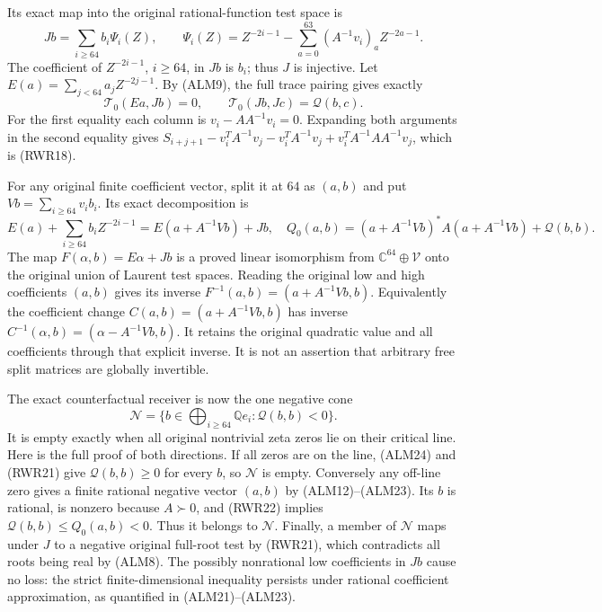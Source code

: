 Its exact map into the original rational-function test space is
\begin{equation}\tag{RWR20}
 Jb=\sum_{i\ge64}b_i\Psi_i(Z),\qquad
 \Psi_i(Z)=Z^{-2i-1}
       -\sum_{a=0}^{63}(A^{-1}v_i)_a Z^{-2a-1}.
\end{equation}
The coefficient of $Z^{-2i-1}$, $i\ge64$, in $Jb$ is $b_i$;
thus $J$ is injective. Let $E(a)=\sum_{j<64}a_jZ^{-2j-1}$.
By (ALM9), the full trace pairing gives exactly
\begin{equation}\tag{RWR21}
 \mathcal T_0(Ea,Jb)=0,\qquad
 \mathcal T_0(Jb,Jc)=\mathscr Q(b,c).
\end{equation}
For the first equality each column is $v_i-AA^{-1}v_i=0$.
Expanding both arguments in the second equality gives
$S_{i+j+1}-v_i^TA^{-1}v_j-v_i^TA^{-1}v_j+
v_i^TA^{-1}AA^{-1}v_j$, which is (RWR18).

For any original finite coefficient vector, split it at $64$ as
$(a,b)$ and put $Vb=\sum_{i\ge64}v_i b_i$. Its exact decomposition is
\begin{equation}\tag{RWR22}
 E(a)+\sum_{i\ge64}b_iZ^{-2i-1}
       =E(a+A^{-1}Vb)+Jb,
 \quad
 Q_0(a,b)=(a+A^{-1}Vb)^*A(a+A^{-1}Vb)+\mathscr Q(b,b).
\end{equation}
The map $F(\alpha,b)=E\alpha+Jb$ is a proved linear isomorphism
from $\mathbb C^{64}\oplus\mathscr V$ onto the original union of
Laurent test spaces. Reading the original low and high coefficients
$(a,b)$ gives its inverse $F^{-1}(a,b)=(a+A^{-1}Vb,b)$.
Equivalently the coefficient change $C(a,b)=(a+A^{-1}Vb,b)$ has
inverse $C^{-1}(\alpha,b)=(\alpha-A^{-1}Vb,b)$.
It retains the original quadratic value and all coefficients through
that explicit inverse. It is not an assertion that arbitrary free
split matrices are globally invertible.

The exact counterfactual receiver is now the one negative cone
\begin{equation}\tag{RWR23}
 \mathscr N=\{b\in\bigoplus_{i\ge64}\mathbb Q e_i:
                         \mathscr Q(b,b)<0\}.
\end{equation}
It is empty exactly when all original nontrivial zeta zeros lie on
their critical line. Here is the full proof of both directions.
If all zeros are on the line, (ALM24) and (RWR21) give
$\mathscr Q(b,b)\ge0$ for every $b$, so $\mathscr N$ is empty.
Conversely any off-line zero gives a finite rational negative vector
$(a,b)$ by (ALM12)--(ALM23). Its $b$ is rational, is nonzero because
$A\succ0$, and (RWR22) implies
$\mathscr Q(b,b)\le Q_0(a,b)<0$. Thus it belongs to $\mathscr N$.
Finally, a member of $\mathscr N$ maps under $J$ to a negative
original full-root test by (RWR21), which contradicts all roots being
real by (ALM8). The possibly nonrational low coefficients in $Jb$
cause no loss: the strict finite-dimensional inequality persists under
rational coefficient approximation, as quantified in (ALM21)--(ALM23).

